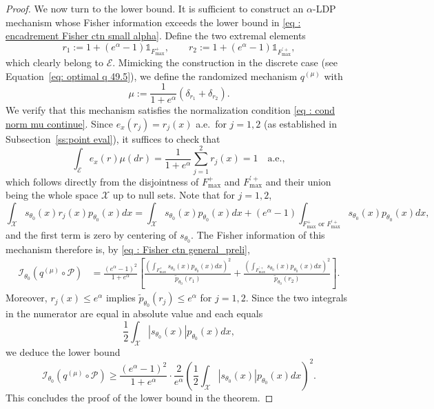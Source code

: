 \documentclass[a4paper, 11pt]{article}
\theoremstyle{definition}
\newcommand{\cE}{{\mathcal{E}}}
\newcommand{\cI}{{\mathcal{I}}}
\newcommand{\cP}{{\mathcal{P}}}
\newcommand{\indi}[1]{\mathds{1}_{#1}}
\begin{document}
{\begin{proof}
\medskip

We now turn to the lower bound. It is sufficient to construct an $\alpha$-LDP mechanism whose Fisher information exceeds the lower bound in \eqref{eq : encadrement Fisher ctn small alpha}. Define the two extremal elements
\[
r_1 := 1 + (e^\alpha - 1) \indi{F^+_{\text{max}}}, \qquad
r_2 := 1 + (e^\alpha - 1) \indi{F^{\prime +}_{\text{max}}},
\]
which clearly belong to $\mathcal{E}$. Mimicking the construction in the discrete case (see Equation~\eqref{eq: optimal q 49.5}), we define the randomized mechanism $q^{(\mu)}$ with
\begin{equation} \label{eq: qmu 28.5}
	\mu := \frac{1}{1 + e^\alpha} \left( \delta_{r_1} + \delta_{r_2} \right).
\end{equation}
We verify that this mechanism satisfies the normalization condition \eqref{eq : cond norm mu continue}. Since $e_x(r_j) = r_j(x)$ a.e.\ for $j=1,2$ (as established in Subsection~\ref{ss:point eval}), it suffices to check that
\[
\int_\cE e_x(r) \mu(dr)=\frac{1}{1 + e^\alpha} \sum_{j=1}^2 r_j(x) = 1 \quad \text{a.e.},
\]
which follows directly from the disjointness of $F^+_{\text{max}}$ and $F^{\prime +}_{\text{max}}$ and their union being the whole space $\mathcal{X}$ up to null sets. Note that for $j=1,2$,
\[
\int_{\mathcal{X}} s_{\theta_0}(x) r_j(x) p_{\theta_0}(x) dx
= \int_{\mathcal{X}} s_{\theta_0}(x) p_{\theta_0}(x) dx +
(e^\alpha - 1) \int_{F^{+}_{\text{max}} \text{ or } F^{\prime +}_{\text{max}}} s_{\theta_0}(x) p_{\theta_0}(x) dx,
\]
and the first term is zero by centering of $s_{\theta_0}$. The Fisher information of this mechanism therefore is, by \eqref{eq : Fisher ctn general_preli},
\begin{align*}
	\cI_{\theta_0}(q^{(\mu)} \circ \cP)
	&= \frac{(e^\alpha - 1)^2}{1 + e^\alpha}
	\left[
	\frac{\left( \int_{F^+_{\text{max}}} s_{\theta_0}(x) p_{\theta_0}(x) dx \right)^2}
	{\widetilde{p}_{\theta_0}(r_1)} +
	\frac{\left( \int_{F^{\prime +}_{\text{max}}} s_{\theta_0}(x) p_{\theta_0}(x) dx \right)^2}
	{\widetilde{p}_{\theta_0}(r_2)}
	\right].
\end{align*}
 Moreover, $r_j(x) \le e^\alpha$ implies $\widetilde{p}_{\theta_0}(r_j) \le e^\alpha$ for $j = 1,2$. Since the two integrals in the numerator are equal in absolute value and each equals
\[
\frac{1}{2} \int_{\mathcal{X}} |s_{\theta_0}(x)| p_{\theta_0}(x) dx,
\]
we deduce the lower bound
\begin{equation*}
	\cI_{\theta_0}(q^{(\mu)} \circ \cP) \ge
	\frac{(e^\alpha - 1)^2}{1 + e^\alpha} \cdot \frac{2}{e^\alpha}
	\left( \frac{1}{2} \int_{\mathcal{X}} |s_{\theta_0}(x)| p_{\theta_0}(x) dx \right)^2.
\end{equation*}
This concludes the proof of the lower bound in the theorem.


\end{proof}}
\end{document}
